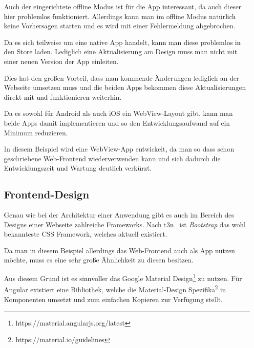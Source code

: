 Auch der eingerichtete offline Modus ist für die App interessant, da auch dieser hier problemlos funktioniert.
Allerdings kann man im offline Modus natürlich keine Vorhersagen starten und es wird mit einer Fehlermeldung
abgebrochen.

Da es sich teilweise um eine native App handelt, kann man diese problemlos in den Store laden. Lediglich eine
Aktualisierung am Design muss man nicht mit einer neuen Version der App einleiten.

Dies hat den großen Vorteil, dass man kommende Änderungen lediglich an der Webseite umsetzen muss und die beiden Apps
bekommen diese Aktualisierungen direkt mit und funktionieren weiterhin.

Da es sowohl für Android als auch iOS ein WebView-Layout gibt, kann man beide Apps damit implementieren und so den
Entwicklungsaufwand auf ein Minimum reduzieren.

In diesem Beispiel wird eine WebView-App entwickelt, da man so dass schon geschriebene Web-Frontend wiederverwenden
kann und sich dadurch die Entwicklungszeit und Wartung deutlich verkürzt.

\subsection{Frontend-Design}
Genau wie bei der Architektur einer Anwendung gibt es auch im Bereich des Designs einer Webseite zahlreiche Frameworks.
Nach t3n~\cite{online_analyse_css} ist \textit{Bootstrap} das wohl bekannteste CSS Framework, welches aktuell existiert.

Da man in diesem Beispiel allerdings das Web-Frontend auch als App nutzen möchte, muss es eine sehr große Ähnlichkeit zu
diesen besitzen.

Aus diesem Grund ist es sinnvoller das Google Material Design\footnote{https://material.angularjs.org/latest} zu nutzen.
Für Angular existiert eine Bibliothek, welche die Material-Design Spezifika\footnote{https://material.io/guidelines} in
Komponenten umsetzt und zum einfachen Kopieren zur Verfügung stellt.